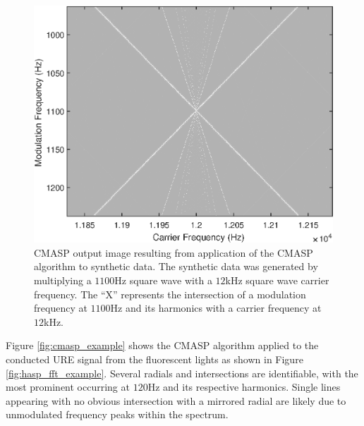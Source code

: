 \begin{figure}[tp]
	\includegraphics[width=\textwidth]{./dasp_algorithm_results/cmasp_synth.eps}
	\centering
	\caption{CMASP output image resulting from application of the CMASP algorithm to synthetic data.  The synthetic data was generated by multiplying a $1100$Hz square wave with a $12$kHz square wave carrier frequency.  The ``X'' represents the intersection of a modulation frequency at $1100$Hz and its harmonics with a carrier frequency at $12$kHz.}
	\label{fig:cmasp_synth_example}
\end{figure}

Figure \ref{fig:cmasp_example} shows the CMASP algorithm applied to the conducted URE signal from the fluorescent lights as shown in Figure \ref{fig:hasp_fft_example}.  Several radials and intersections are identifiable, with the most prominent occurring at $120$Hz and its respective harmonics.  Single lines appearing with no obvious intersection with a mirrored radial are likely due to unmodulated frequency peaks within the spectrum.
 
